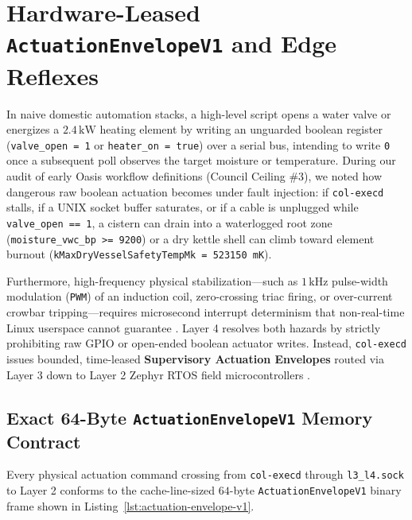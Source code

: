 \section{Hardware-Leased \texttt{ActuationEnvelopeV1} and Edge Reflexes}
\label{sec:actuation-envelope-reflexes}

In naive domestic automation stacks, a high-level script opens a water valve or energizes a
$2.4\,\mathrm{kW}$ heating element by writing an unguarded boolean register (\texttt{valve\_open
= 1} or \texttt{heater\_on = true}) over a serial bus, intending to write \texttt{0} once a
subsequent poll observes the target moisture or temperature. During our audit of early Oasis
workflow definitions (Council Ceiling \#3), we noted how dangerous raw boolean actuation becomes
under fault injection: if \texttt{col-execd} stalls, if a UNIX socket buffer saturates, or if a
cable is unplugged while \texttt{valve\_open == 1}, a cistern can drain into a waterlogged root
zone (\texttt{moisture\_vwc\_bp >= 9200}) or a dry kettle shell can climb toward element burnout
(\texttt{kMaxDryVesselSafetyTempMk = 523150 mK}).

Furthermore, high-frequency physical stabilization---such as $1\,\mathrm{kHz}$ pulse-width
modulation (\texttt{PWM}) of an induction coil, zero-crossing triac firing, or over-current
crowbar tripping---requires microsecond interrupt determinism that non-real-time Linux userspace
cannot guarantee \parencite{liu1973scheduling,zephyr2024}. Layer 4 resolves both hazards by
strictly prohibiting raw GPIO or open-ended boolean actuator writes. Instead, \texttt{col-execd}
issues bounded, time-leased \textbf{Supervisory Actuation Envelopes} routed via Layer 3 down to
Layer 2 Zephyr RTOS field microcontrollers \parencite{zephyr2024}.

\subsection{Exact 64-Byte \texttt{ActuationEnvelopeV1} Memory Contract}

Every physical actuation command crossing from \texttt{col-execd} through \texttt{l3\_l4.sock}
to Layer 2 conforms to the cache-line-sized $64$-byte \texttt{ActuationEnvelopeV1} binary frame
shown in Listing~\ref{lst:actuation-envelope-v1}.

